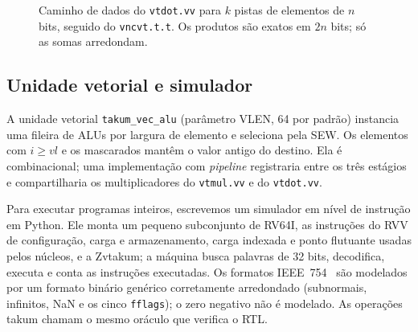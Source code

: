 \documentclass[conference]{IEEEtran}
\newcommand{\code}[1]{\texttt{#1}}
\begin{document}
\begin{figure}[t]
\centering
{}
\caption{Caminho de dados do \code{vtdot.vv} para $k$ pistas de elementos de $n$ bits, seguido do
\code{vncvt.t.t}. Os produtos são exatos em $2n$ bits; só as somas arredondam.}
\label{fig:dot}
\end{figure}

\subsection{Unidade vetorial e simulador}

A unidade vetorial \code{takum\_vec\_alu} (parâmetro VLEN, 64 por padrão) instancia uma fileira de ALUs
por largura de elemento e seleciona pela SEW. Os elementos com $i\ge \mathit{vl}$ e os mascarados mantêm o
valor antigo do destino. Ela é combinacional; uma implementação com \emph{pipeline} registraria entre os
três estágios e compartilharia os multiplicadores do \code{vtmul.vv} e do \code{vtdot.vv}.

Para executar programas inteiros, escrevemos um simulador em nível de instrução em Python. Ele monta um
pequeno subconjunto de RV64I, as instruções do RVV de configuração, carga e armazenamento, carga indexada
e ponto flutuante usadas pelos núcleos, e a Zvtakum; a máquina busca palavras de 32 bits, decodifica,
executa e conta as instruções executadas. Os formatos IEEE~754~\cite{ieee754} são modelados por um formato
binário genérico corretamente arredondado (subnormais, infinitos, NaN e os cinco \code{fflags}); o zero
negativo não é modelado. As operações takum chamam o mesmo oráculo que verifica o RTL.
\end{document}
